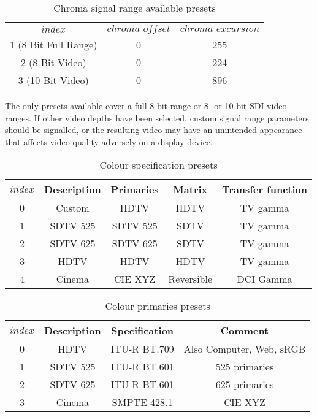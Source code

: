 \begin{table}[!ht]
\centering
\begin{tabular}{|c|c|c|}
\hline
$index$ & $chroma\_offset$ & $chroma\_excursion$ \\
\hline
1 (8 Bit Full Range) & 0 & 255 \\
\hline
2 (8 Bit Video) & 0 & 224 \\
\hline
3 (10 Bit Video) & 0 & 896 \\
\hline
\end{tabular}
\caption{Chroma signal range available presets}\label{table:chromasignalrangevalues}
\end{table}

\begin{informative}
The only presets available cover a full 8-bit range or 8- or 10-bit SDI video ranges.
If other video depths have been selected, custom signal range parameters
should be signalled, or the resulting video may have an unintended appearance that
affects video quality adversely on a display device.
\end{informative}

\begin{table}[!ht]
\centering
\begin{tabular}{|c|c|c|c|c|}
\hline
$index$ & {\bf Description}           & {\bf Primaries}       & {\bf Matrix}  & {\bf Transfer function}\\
\hline
0 & Custom & HDTV & HDTV & TV gamma \\ 
\hline
1 & SDTV 525 & SDTV 525 & SDTV & TV gamma \\
\hline
2 & SDTV 625 & SDTV 625 & SDTV & TV gamma \\
\hline
3 & HDTV & HDTV & HDTV & TV gamma \\
\hline
4 & Cinema & CIE XYZ & Reversible & DCI Gamma \\
\hline
\end{tabular}
\caption{Colour specification presets}\label{table:colourspecvalues}
\end{table}

\begin{table}[!ht]
\centering
\begin{tabular}{|c|c|c|c|}
\hline
$index$ &  {\bf Description} & {\bf Specification} & {\bf Comment}      \\
\hline
0       &  HDTV & ITU-R BT.709 & Also Computer, Web, sRGB \\ 
\hline
1       &  SDTV 525 & ITU-R BT.601 & 525 primaries          \\
\hline
2       &  SDTV 625 & ITU-R BT.601 & 625 primaries  \\
\hline
3       &  Cinema & SMPTE 428.1 & CIE XYZ              \\
\hline
\end{tabular}
\caption{Colour primaries presets}\label{table:primariesvalues}
\end{table}

